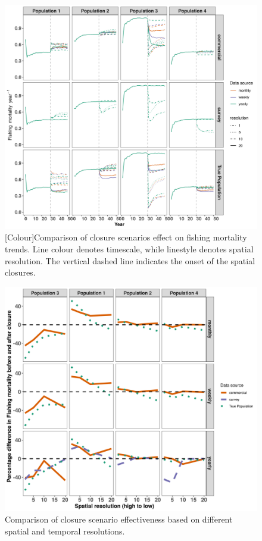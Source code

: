 \documentclass[review]{elsarticle}
\begin{document}
\begin{figure}[!ht]
	\includegraphics[width = \linewidth]{../analysis/F_trendsREV}
	\caption{[Colour]Comparison of closure scenarios effect on fishing mortality
		trends. Line colour denotes timescale, while linestyle
		denotes spatial resolution. The vertical dashed line
		indicates the onset of the spatial closures.}
	\label{fig:3}
\end{figure}

\begin{figure}[!ht]
	\includegraphics[width =\linewidth]{./Plots/f_diff_effectiveness}
	\caption{Comparison of closure scenario effectiveness based on
		different spatial and temporal resolutions.}
	\label{fig:4}
\end{figure}	
\end{document}
